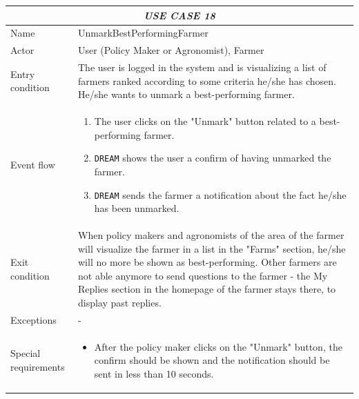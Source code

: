 \documentclass{article}
\begin{document}

\centering
\begin{longtable}{|p{3.5cm}|m{8cm}|}
 \hline
 \multicolumn{2}{|c|}{\cellcolor{white}\emph{USE CASE 18}} \\
 \endfirsthead
 \endhead
 \endfoot
 \endlastfoot
 \hline
 Name & UnmarkBestPerformingFarmer\\
 \hline
 Actor & User (Policy Maker or Agronomist), Farmer\\
 \hline
 Entry condition & The user is logged in the system and is visualizing a list of farmers ranked according to some criteria he/she has chosen. He/she wants to unmark a best-performing farmer.\\
 \hline
 Event flow & \begin{enumerate}
    \item The user clicks on the "Unmark" button related to a best-performing farmer.
    \item \verb|DREAM| shows the user a confirm of having unmarked the farmer.
    \item \verb|DREAM| sends the farmer a notification about the fact he/she has been unmarked.
 \end{enumerate}\\
 \hline
 Exit condition &  When policy makers and agronomists of the area of the farmer will visualize the farmer in a list in the "Farms" section, he/she will no more be shown as best-performing.
 Other farmers are not able anymore to send questions to the farmer - the My Replies section in the homepage of the farmer stays there, to display past replies.\\
 \hline
 Exceptions & -\\
 \hline
 Special requirements &\begin{itemize}
     \item After the policy maker clicks on the "Unmark" button, the confirm should be shown and the notification should be sent in less than 10 seconds.
 \end{itemize}\\
 \hline
\end{longtable}
\end{document}

